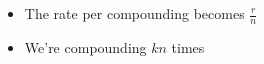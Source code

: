 \documentclass[preview]{standalone}
\begin{document}
\begin{center}
\begin{itemize} \item The rate per compounding becomes $\frac rn$ \\ \item We're compounding $kn$ times \end{itemize}
\end{center}
\end{document}
